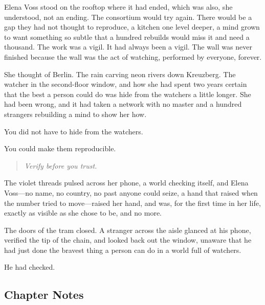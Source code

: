 \documentclass[12pt,letterpaper]{book}
\begin{document}
Elena Voss stood on the rooftop where it had ended, which was also, she
understood, not an ending. The consortium would try again. There would be a gap
they had not thought to reproduce, a kitchen one level deeper, a mind grown to
want something so subtle that a hundred rebuilds would miss it and need a
thousand. The work was a vigil. It had always been a vigil. The wall was never
finished because the wall was the act of watching, performed by everyone, forever.

She thought of Berlin. The rain carving neon rivers down Kreuzberg. The watcher in
the second-floor window, and how she had spent two years certain that the best a
person could do was hide from the watchers a little longer. She had been wrong, and
it had taken a network with no master and a hundred strangers rebuilding a mind to
show her how.

You did not have to hide from the watchers.

You could make them reproducible.

\begin{quote}
\emph{Verify before you trust.}
\end{quote}

The violet threads pulsed across her phone, a world checking itself, and Elena
Voss---no name, no country, no past anyone could seize, a hand that raised when the
number tried to move---raised her hand, and was, for the first time in her life,
exactly as visible as she chose to be, and no more.

The doors of the tram closed. A stranger across the aisle glanced at his phone,
verified the tip of the chain, and looked back out the window, unaware that he had
just done the bravest thing a person can do in a world full of watchers.

He had checked.

\hypertarget{chapter-10-notes}{%
\subsection{Chapter Notes}\label{chapter-10-notes}}
\end{document}
